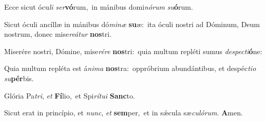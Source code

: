 Ecce sicut ócu\textit{li} \textit{ser}\textbf{vó}rum,~\redgreheightstar in mánibus domi\textit{nó}\textit{rum} \textit{su}\textbf{ó}rum.

Sicut óculi ancíllæ in mánibus dó\textit{mi}\textit{næ} \textbf{su}æ:~\redgreheightstar ita óculi nostri ad Dóminum, Deum nostrum, donec mise\textit{re}\textit{á}\textit{tur} \textbf{nos}tri.

Miserére nostri, Dómine, mise\textit{ré}\textit{re} \textbf{nos}tri:~\redgreheightstar quia multum repléti sumus \textit{de}\textit{spec}\textit{ti}\textbf{ó}ne:

Quia multum repléta est á\textit{ni}\textit{ma} \textbf{nos}tra:~\redgreheightstar oppróbrium abundántibus, et despéc\textit{ti}\textit{o} \textit{su}\textbf{pér}bis.

Glória Pa\textit{tri}, \textit{et} \textbf{Fí}lio,~\redgreheightstar et Spi\textit{rí}\textit{tu}\textit{i} \textbf{Sanc}to.

Sicut erat in princípio, et \textit{nunc}, \textit{et} \textbf{sem}per,~\redgreheightstar et in sǽcula sæ\textit{cu}\textit{ló}\textit{rum}. \textbf{A}men.

